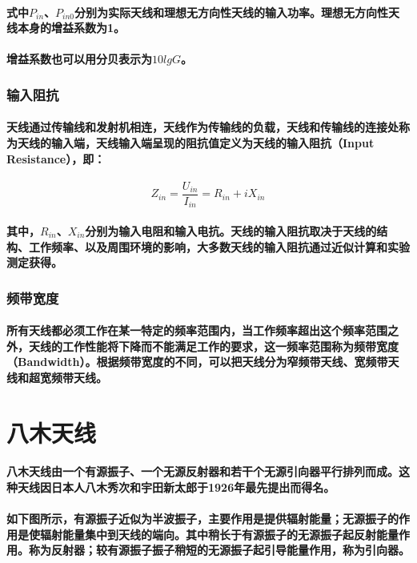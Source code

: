 \documentclass[UTF8]{ctexart}
\begin{document}
\paragraph{式中$P_{in}$、$P_{in0}$分别为实际天线和理想无方向性天线的输入功率。理想无方向性天线本身的增益系数为1。}
\paragraph{增益系数也可以用分贝表示为$10lgG$。}
\subsubsection{输入阻抗}
\paragraph{天线通过传输线和发射机相连，天线作为传输线的负载，天线和传输线的连接处称为天线的输入端，天线输入端呈现的阻抗值定义为天线的输入阻抗（Input Resistance），即：}
\begin{equation}
Z_{in} = \frac{U_{in}}{I_{in}} = R_{in} + iX_{in}
\end{equation}
\paragraph{其中，$R_{in}$、$X_{in}$分别为输入电阻和输入电抗。天线的输入阻抗取决于天线的结构、工作频率、以及周围环境的影响，大多数天线的输入阻抗通过近似计算和实验测定获得。}
\subsubsection{频带宽度}
\paragraph{所有天线都必须工作在某一特定的频率范围内，当工作频率超出这个频率范围之外，天线的工作性能将下降而不能满足工作的要求，这一频率范围称为频带宽度（Bandwidth）。根据频带宽度的不同，可以把天线分为窄频带天线、宽频带天线和超宽频带天线。}
\section{八木天线}
\paragraph{八木天线由一个有源振子、一个无源反射器和若干个无源引向器平行排列而成。这种天线因日本人八木秀次和宇田新太郎于1926年最先提出而得名。}
\paragraph{如下图所示，有源振子近似为半波振子，主要作用是提供辐射能量；无源振子的作用是使辐射能量集中到天线的端向。其中稍长于有源振子的无源振子起反射能量作用。称为反射器；较有源振子振子稍短的无源振子起引导能量作用，称为引向器。}
\end{document}
